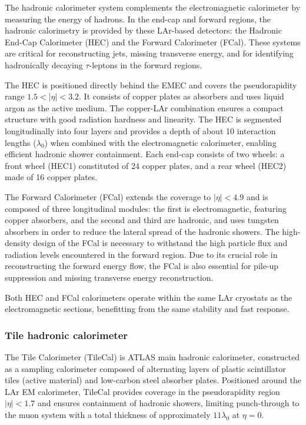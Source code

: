 The hadronic calorimeter system complements the electromagnetic calorimeter by measuring the energy of hadrons. In the end-cap and forward regions, the hadronic calorimetry is provided by these LAr-based detectors: the Hadronic End-Cap Calorimeter (HEC) and the Forward Calorimeter (FCal). These systems are critical for reconstructing jets, missing transverse energy, and for identifying hadronically decaying $\tau$-leptons in the forward regions.

The HEC is positioned directly behind the EMEC and covers the pseudorapidity range $1.5 < |\eta| < 3.2$. It consists of copper plates as absorbers and uses liquid argon as the active medium. The copper-LAr combination ensures a compact structure with good radiation hardness and linearity. The HEC is segmented longitudinally into four layers and provides a depth of about 10 interaction lengths ($\lambda_0$) when combined with the electromagnetic calorimeter, enabling efficient hadronic shower containment. Each end-cap consists of two wheels: a front wheel (HEC1) constituted of 24 copper plates, and a rear wheel (HEC2) made of 16 copper plates.

The Forward Calorimeter (FCal) extends the coverage to $|\eta| < 4.9$ and is composed of three longitudinal modules: the first is electromagnetic, featuring copper absorbers, and the second and third are hadronic, and uses tungsten absorbers in order to reduce the lateral spread of the hadronic showers. The high-density design of the FCal is necessary to withstand the high particle flux and radiation levels encountered in the forward region. Due to its crucial role in reconstructing the forward energy flow, the FCal is also essential for pile-up suppression and missing transverse energy reconstruction.

Both HEC and FCal calorimeters operate within the same LAr cryostats as the electromagnetic sections, benefitting from the same stability and fast response. 

\subsubsection{Tile hadronic calorimeter}
\label{sec:tilecal}

The Tile Calorimeter (TileCal) is ATLAS main hadronic calorimeter, constructed as a sampling calorimeter composed of alternating layers of plastic scintillator tiles (active material) and low-carbon steel absorber plates. Positioned around the LAr EM calorimeter, TileCal provides coverage in the pseudorapidity region $|\eta|<1.7$ and ensures containment of hadronic showers, limiting punch-through to the muon system with a total thickness of approximately $11\lambda_0$ at $\eta=0$.

